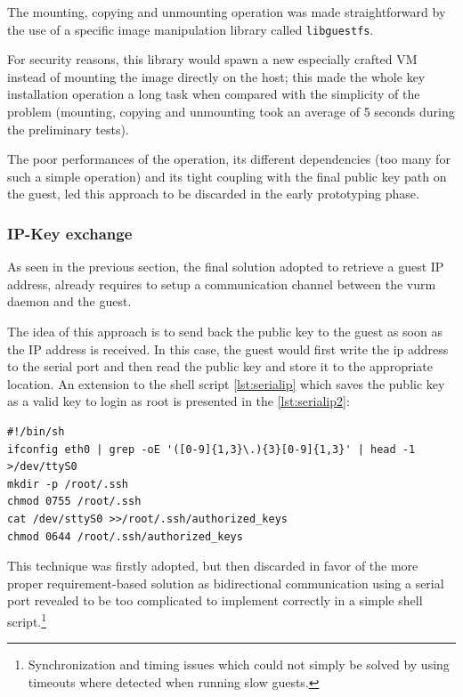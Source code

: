 The mounting, copying and unmounting operation was made straightforward by the use of a specific image manipulation library called \texttt{libguestfs}.

For security reasons, this library would spawn a new especially crafted VM instead of mounting the image directly on the host; this made the whole key installation operation a long task when compared with the simplicity of the problem (mounting, copying and unmounting took an average of 5 seconds during the preliminary tests).

The poor performances of the operation, its different dependencies (too many for such a simple operation) and its tight coupling with the final public key path on the guest, led this approach to be discarded in the early prototyping phase.

\subsubsection{IP-Key exchange}

As seen in the previous section, the final solution adopted to retrieve a guest IP address, already requires to setup a communication channel between the \gls{vurm} daemon and the guest.

The idea of this approach is to send back the public key to the guest as soon as the IP address is received. In this case, the guest would first write the \gls{ip} address to the serial port and then read the public key and store it to the appropriate location. An extension to the shell script \ref{lst:serialip} which saves the public key as a valid key to login as root is presented in the \autoref{lst:serialip2}:

\lstset{language=bash,caption=Shell script to exchange the IP address and a public key over the serial port,label=lst:serialip2}
\begin{lstlisting}
#!/bin/sh
ifconfig eth0 | grep -oE '([0-9]{1,3}\.){3}[0-9]{1,3}' | head -1 >/dev/ttyS0
mkdir -p /root/.ssh
chmod 0755 /root/.ssh
cat /dev/sttyS0 >>/root/.ssh/authorized_keys
chmod 0644 /root/.ssh/authorized_keys
\end{lstlisting}

This technique was firstly adopted, but then discarded in favor of the more proper requirement-based solution as bidirectional communication using a serial port revealed to be too complicated to implement correctly in a simple shell script.\footnote{Synchronization and timing issues which could not simply be solved by using timeouts where detected when running slow guests.}

